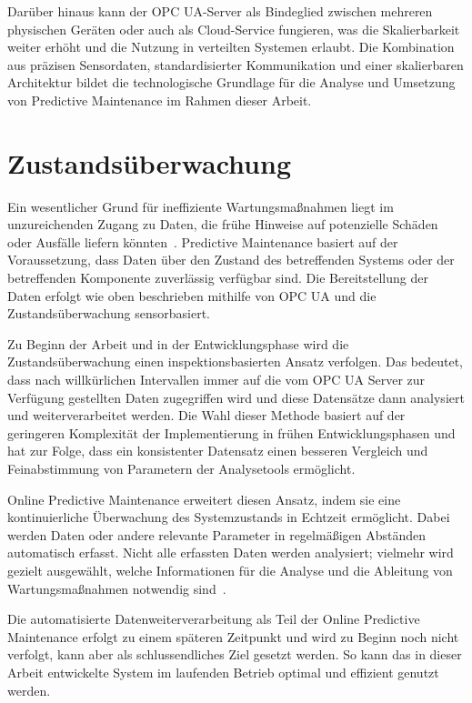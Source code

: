Darüber hinaus kann der OPC UA-Server als Bindeglied zwischen mehreren physischen Geräten oder auch als Cloud-Service fungieren,
was die Skalierbarkeit weiter erhöht und die Nutzung in verteilten Systemen erlaubt. Die Kombination aus präzisen Sensordaten,
standardisierter Kommunikation und einer skalierbaren Architektur bildet die technologische Grundlage für die Analyse und Umsetzung
von Predictive Maintenance im Rahmen dieser Arbeit.

\section{Zustandsüberwachung}\label{sec:zustandsueberwachung}
Ein wesentlicher Grund für ineffiziente Wartungsmaßnahmen liegt im unzureichenden Zugang zu Daten, die frühe Hinweise auf
potenzielle Schäden oder Ausfälle liefern könnten~\cite{Mobley2002}. Predictive Maintenance basiert auf der Voraussetzung, dass
Daten über den Zustand des betreffenden Systems oder der betreffenden Komponente zuverlässig verfügbar sind. Die Bereitstellung der
Daten erfolgt wie oben beschrieben mithilfe von OPC UA und die Zustandsüberwachung sensorbasiert.

Zu Beginn der Arbeit und in der Entwicklungsphase wird die Zustandsüberwachung einen inspektionsbasierten Ansatz verfolgen. Das
bedeutet, dass nach willkürlichen Intervallen immer auf die vom OPC UA Server zur Verfügung gestellten Daten zugegriffen wird und
diese Datensätze dann analysiert und weiterverarbeitet werden. Die Wahl dieser Methode basiert auf der geringeren Komplexität der
Implementierung in frühen Entwicklungsphasen und hat zur Folge, dass ein konsistenter Datensatz einen besseren Vergleich und
Feinabstimmung von Parametern der Analysetools ermöglicht.

Online Predictive Maintenance erweitert diesen Ansatz, indem sie eine kontinuierliche Überwachung des Systemzustands in Echtzeit
ermöglicht. Dabei werden Daten oder andere relevante Parameter in regelmäßigen Abständen automatisch erfasst. Nicht alle erfassten
Daten werden analysiert; vielmehr wird gezielt ausgewählt, welche Informationen für die Analyse und die Ableitung von Wartungsmaßnahmen
notwendig sind~\cite{Lindstroem2017}.

Die automatisierte Datenweiterverarbeitung als Teil der Online Predictive Maintenance erfolgt zu einem späteren Zeitpunkt und wird zu
Beginn noch nicht verfolgt, kann aber als schlussendliches Ziel gesetzt werden. So kann das in dieser Arbeit entwickelte System im
laufenden Betrieb optimal und effizient genutzt werden.


